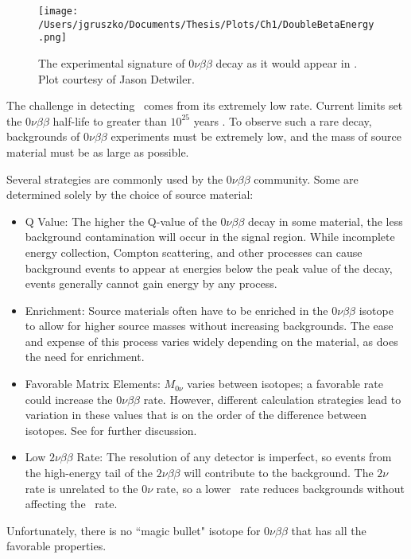 \begin{figure}[]
\centering
\texttt{[image: /Users/jgruszko/Documents/Thesis/Plots/Ch1/DoubleBetaEnergy.png]} 
      \caption{The experimental signature of $0\nu\beta\beta$ decay as it would appear in . Plot courtesy of Jason Detwiler.}
      \label{0nBBspectrum}  
\end{figure}

The challenge in detecting \nonubb\ comes from its extremely low rate. Current limits set the $0\nu\beta\beta$ half-life to greater than $10^{25}$ years \cite{EXO2014}. To observe such a rare decay, backgrounds of $0\nu\beta\beta$ experiments must be extremely low, and the mass of source material must be as large as possible. 

Several strategies are commonly used by the $0\nu\beta\beta$ community. Some are determined solely by the choice of source material:
\begin{itemize}
\item Q Value: The higher the Q-value of the $0\nu\beta\beta$ decay in some material, the less background contamination will occur in the signal region. While incomplete energy collection, Compton scattering, and other processes can cause background events to appear at energies below the peak value of the decay, events generally cannot gain energy by any process. 
\item Enrichment: Source materials often have to be enriched in the $0\nu\beta\beta$ isotope to allow for higher source masses without increasing backgrounds. The ease and expense of this process varies widely depending on the material, as does the need for enrichment.
\item Favorable Matrix Elements: $M_{0\nu}$ varies between isotopes; a favorable rate could increase the $0\nu\beta\beta$ rate. However, different calculation strategies lead to variation in these values that is on the order of the difference between isotopes. See \cite{Simkovic2009} for further discussion. 
\item Low $2\nu\beta\beta$ Rate: The resolution of any detector is imperfect, so events from the high-energy tail of the $2\nu\beta\beta$ will contribute to the background. The $2\nu$ rate is unrelated to the $0\nu$ rate, so a lower \twonubb\ rate reduces backgrounds without affecting the \nonubb\ rate.
\end{itemize} 
Unfortunately, there is no ``magic bullet" isotope for $0\nu\beta\beta$ that has all the favorable properties. 

